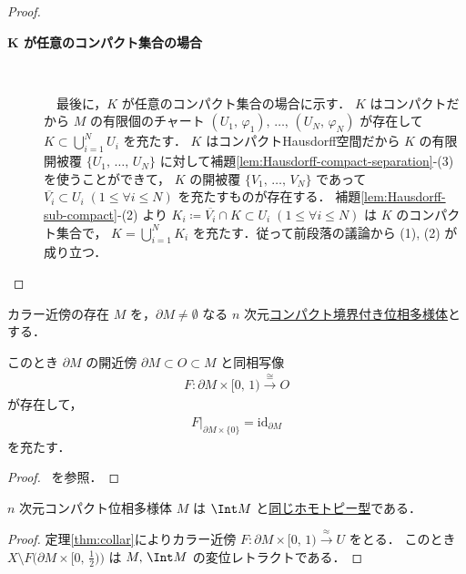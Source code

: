 \documentclass[algtopo_main]{subfiles}
\begin{document}
\begin{proof}
\begin{description}
\begin{description}
            \item[\textbf{$\bm{K}$ が任意のコンパクト集合の場合}]　
            
            　最後に，$K$ が任意のコンパクト集合の場合に示す．
            $K$ はコンパクトだから $M$ の有限個のチャート $(U_1,\, \varphi_1),\, \dots ,\, (U_N,\, \varphi_N)$ が存在して $K \subset \bigcup_{i=1}^N U_i$ を充たす．
            $K$ はコンパクトHausdorff空間だから $K$ の有限開被覆 $\{U_1,\, \dots ,\, U_N\}$ に対して補題\ref{lem:Hausdorff-compact-separation}-(3)を使うことができて，
            $K$ の開被覆 $\{V_1,\, \dots ,\, V_N\}$ であって $\overline{V_i} \subset U_i\; (1 \le \forall i \le N)$ を充たすものが存在する．
            補題\ref{lem:Hausdorff-sub-compact}-(2) より $K_i \coloneqq \overline{V_i} \cap K \subset U_i \; (1 \le \forall i \le N)$ は $K$ のコンパクト集合で，
            $K = \bigcup_{i=1}^N K_i$ を充たす．従って前段落の議論から (1), (2) が成り立つ．
        \end{description}
    \end{description}
    
\end{proof}


\begin{mytheo}[label=thm:collar]{カラー近傍の存在}
    $M$ を，$\partial M \neq \emptyset$ なる $n$ 次元\underline{コンパクト}\hyperref[def:mani-with-boundary]{境界付き位相多様体}とする．

    このとき $\partial M$ の開近傍 $\partial M \subset O \subset M$ と同相写像
    \begin{align}
        F \colon \partial M \times [0,\, 1) \xrightarrow{\cong} O
    \end{align}
    が存在して，
    \begin{align}
        F|_{\partial M \times \{0\}} = \mathrm{id}_{\partial M}
    \end{align}
    を充たす．
\end{mytheo}

\begin{proof}
    ~\cite[定理4.5.8]{Nariya}を参照．
\end{proof}


\begin{mycol}[label=col:collar]{}
    $n$ 次元コンパクト位相多様体 $M$ は $\Int M$ と\hyperref[def:homotopic]{同じホモトピー型}である．
\end{mycol}

\begin{proof}
    定理\ref{thm:collar}によりカラー近傍 $F \colon \partial M \times [0,\, 1) \xrightarrow{\approx} U$ をとる．
    このとき $X \setminus F\bigl(\partial M \times [0,\, \frac{1}{2})\bigr)$ は $M,\, \Int M$ の変位レトラクトである．
\end{proof}
\end{document}
